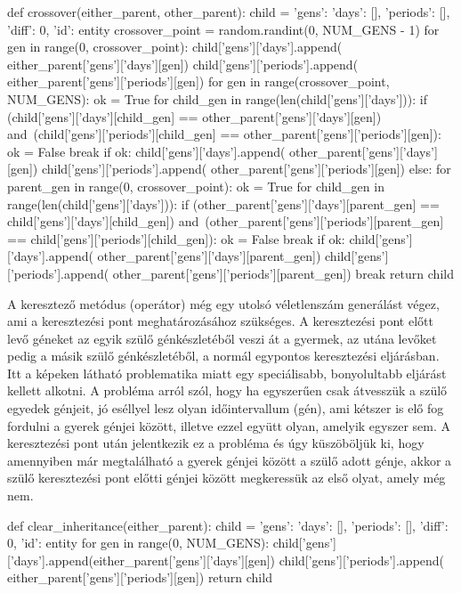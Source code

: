 \begin{python}
	def crossover(either_parent, other_parent):
	child = {'gens': {'days': [], 'periods': []},
		'diff': 0, 'id': entity}
	crossover_point = random.randint(0, NUM_GENS - 1)
	for gen in range(0, crossover_point):
	child['gens']['days'].append(
	either_parent['gens']['days'][gen])
	child['gens']['periods'].append(
	either_parent['gens']['periods'][gen])
	for gen in range(crossover_point, NUM_GENS):
	ok = True
	for child_gen in range(len(child['gens']['days'])):
	if (child['gens']['days'][child_gen] ==
	other_parent['gens']['days'][gen]) and\
	(child['gens']['periods'][child_gen] ==
	other_parent['gens']['periods'][gen]):
	ok = False
	break
	if ok:
	child['gens']['days'].append(
	other_parent['gens']['days'][gen])
	child['gens']['periods'].append(
	other_parent['gens']['periods'][gen])
	else:
	for parent_gen in range(0, crossover_point):
	ok = True
	for child_gen in range(len(child['gens']['days'])):
	if (other_parent['gens']['days'][parent_gen] ==
	child['gens']['days'][child_gen]) and\
	(other_parent['gens']['periods'][parent_gen] ==
	child['gens']['periods'][child_gen]):
	ok = False
	break
	if ok:
	child['gens']['days'].append(
	other_parent['gens']['days'][parent_gen])
	child['gens']['periods'].append(
	other_parent['gens']['periods'][parent_gen])
	break
	return child
\end{python}

A keresztező metódus (operátor) még egy utolsó véletlenszám generálást végez, ami a keresztezési pont meghatározásához szükséges. A keresztezési pont előtt levő géneket az egyik szülő génkészletéből veszi át a gyermek, az utána levőket pedig a másik szülő génkészletéből, a normál egypontos keresztezési eljárásban. Itt a képeken látható problematika miatt egy speciálisabb, bonyolultabb eljárást kellett alkotni. A probléma arról szól, hogy ha egyszerűen csak átvesszük a szülő egyedek génjeit, jó eséllyel lesz olyan időintervallum (gén), ami kétszer is elő fog fordulni a gyerek génjei között, illetve ezzel együtt olyan, amelyik egyszer sem. A keresztezési pont után jelentkezik ez a probléma és úgy küszöböljük ki, hogy amennyiben már megtalálható a gyerek génjei között a szülő adott génje, akkor a szülő keresztezési pont előtti génjei között megkeressük az első olyat, amely még nem.

\begin{python}
	def clear_inheritance(either_parent):
	child = {'gens': {'days': [], 'periods': []}, 
		'diff': 0, 'id': entity}
	for gen in range(0, NUM_GENS):
	child['gens']['days'].append(either_parent['gens']['days'][gen])
	child['gens']['periods'].append(
	either_parent['gens']['periods'][gen])
	return child
\end{python}


